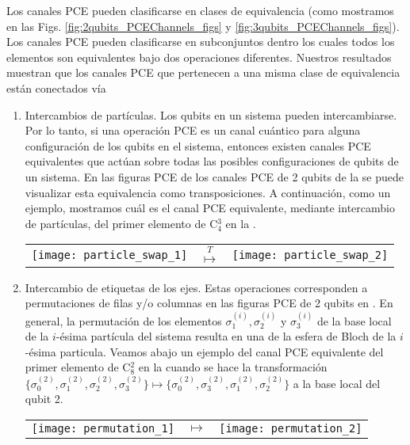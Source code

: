 Los canales PCE pueden clasificarse en clases de equivalencia (como 
mostramos en las Figs. \ref{fig:2qubits_PCEChannels_figs} y 
\ref{fig:3qubits_PCEChannels_figs}). 
Los canales PCE pueden clasificarse en subconjuntos dentro los cuales todos 
los elementos son equivalentes bajo dos operaciones diferentes. 
Nuestros resultados muestran que los canales PCE que pertenecen a 
una misma clase de equivalencia están conectados vía 
\begin{enumerate}
	\item Intercambios de partículas. Los qubits en un sistema pueden 
	intercambiarse. Por lo tanto, si una operación PCE es un canal cuántico 
	para alguna configuración de los qubits en el sistema, entonces existen canales 
	PCE equivalentes que actúan sobre todas las posibles configuraciones 
	de qubits de un sistema. En las figuras PCE de los canales PCE de 2 qubits 
	de la  
	se puede visualizar esta equivalencia como transposiciones. A continuación,
	como un ejemplo, 
	mostramos cuál es el canal PCE equivalente, mediante intercambio
	de partículas, del primer elemento de C${}_4^3$ en la .
	\begin{center}
	\begin{tabular}{P{2cm} P{1.5cm} P{2cm}}
		\texttt{[image: particle\_swap\_1]}
		& \hspace*{\fill} $\stackrel{T}{\longmapsto}$ \hspace*{\fill}
		& \texttt{[image: particle\_swap\_2]}
	\end{tabular}
	\end{center}
	
	\item Intercambio de etiquetas de los ejes. Estas operaciones corresponden 
	a permutaciones de filas y/o columnas en las figuras PCE de 2 qubits 
	en . En general, la permutación de los 
	elementos $\sigma_1^{(i)},\sigma_2^{(i)}$ y $\sigma_3^{(i)}$ de la 
	base local de la $i$-ésima partícula del sistema resulta en una  
	de la esfera de Bloch de la $i$-ésima particula. Veamos abajo un 
	ejemplo del canal PCE equivalente del primer elemento de C${}_8^2$
	en la  cuando se hace la transformación
	$\{\sigma_0^{(2)},\sigma_1^{(2)},\sigma_2^{(2)},\sigma_3^{(2)}\}\mapsto
	\{\sigma_0^{(2)},\sigma_3^{(2)},\sigma_1^{(2)},\sigma_2^{(2)}\}$
	a la base local del qubit 2.
	\begin{center}
	\begin{tabular}{P{2cm} P{1.5cm} P{2cm}}
		\texttt{[image: permutation\_1]}
		& \hspace*{\fill} $\longmapsto$ \hspace*{\fill}
		& \texttt{[image: permutation\_2]}
	\end{tabular}
	\end{center}
\end{enumerate}
